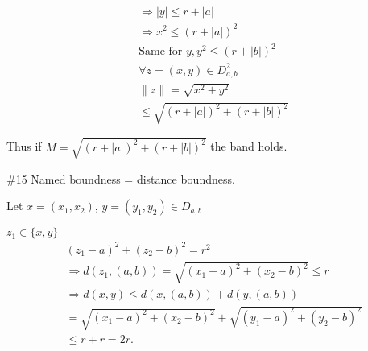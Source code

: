 \documentclass{article}
\theoremstyle{definition}
\numberwithin{equation}{section}
\begin{document}
\begin{align*}
& \Rightarrow |y| \leq r + |a| \\
& \Rightarrow x^2 \leq (r + |a|)^2 \\
& \text{Same for } y, y^2 \leq (r + |b|)^2 \\
& \forall z = (x, y) \in D^2_{a,b} \\
& \| z \| = \sqrt{x^2 + y^2} \\
& \leq \sqrt{(r + |a|)^2 + (r + |b|)^2}
\end{align*}

Thus if 
$
M = \sqrt{(r + |a|)^2 + (r + |b|)^2}
$
the band holds.

\#15 Named boundness = distance boundness.

Let $x = (x_1, x_2)$, $y = (y_1, y_2) \in D_{a,b}$

$z_1 \in \{ x, y \}$
\begin{align*}
& (z_1 - a)^2 + (z_2 - b)^2 = r^2 \\
& \Rightarrow d(z_1, (a,b)) = \sqrt{(x_1 - a)^2 + (x_2 - b)^2} \leq r \\
& \Rightarrow d(x,y) \leq d(x,(a,b)) + d(y, (a,b)) \\
& = \sqrt{(x_1 - a)^2 + (x_2 - b)^2} + \sqrt{(y_1 - a)^2 + (y_2 - b)^2} \\
& \leq r + r = 2r.
\end{align*}
\end{document}
